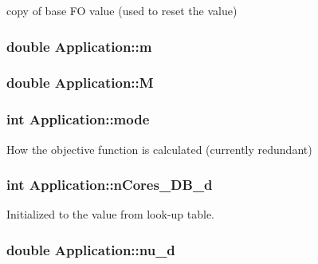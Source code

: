 copy of base F\-O value (used to reset the value) 

\hypertarget{classApplication_ab903d83d3cde51569a27f97752c9f158}{
\subsubsection[{m}]{\setlength{\rightskip}{0pt plus 5cm}double Application\-::m}}\label{classApplication_ab903d83d3cde51569a27f97752c9f158}
\hypertarget{classApplication_a14904a2abf46cc0a50eb82043fa0912e}{
\subsubsection[{M}]{\setlength{\rightskip}{0pt plus 5cm}double Application\-::\-M}}\label{classApplication_a14904a2abf46cc0a50eb82043fa0912e}
\hypertarget{classApplication_abc7e87e8cbe2e64fa4e2ff2afdf7a4fc}{
\subsubsection[{mode}]{\setlength{\rightskip}{0pt plus 5cm}int Application\-::mode}}\label{classApplication_abc7e87e8cbe2e64fa4e2ff2afdf7a4fc}


How the objective function is calculated (currently redundant) 

\hypertarget{classApplication_a95104d330c9c7ed2c1017b4938a39a9a}{
\subsubsection[{n\-Cores\-\_\-\-D\-B\-\_\-d}]{\setlength{\rightskip}{0pt plus 5cm}int Application\-::n\-Cores\-\_\-\-D\-B\-\_\-d}}\label{classApplication_a95104d330c9c7ed2c1017b4938a39a9a}


Initialized to the value from look-\/up table. 

\hypertarget{classApplication_a42c22b9a3130cf1f2722ce222f2e5bae}{
\subsubsection[{nu\-\_\-d}]{\setlength{\rightskip}{0pt plus 5cm}double Application\-::nu\-\_\-d}}\label{classApplication_a42c22b9a3130cf1f2722ce222f2e5bae}


